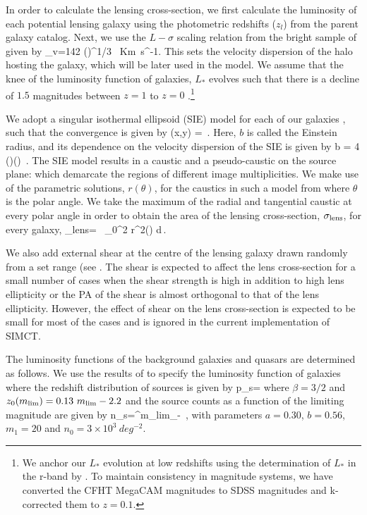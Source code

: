\documentclass[useAMS,usenatbib,a4paper]{mn2e}
\begin{document}
In order to calculate the lensing cross-section, we first calculate the
luminosity of each potential lensing galaxy using the photometric redshifts
($z_l$) from the parent galaxy catalog. Next, we use the $L-\sigma$ scaling relation from the
bright sample of \citep{Parker2005} given by
\be
\label{magstar2}
\sigma_v=142 \left(\right)^{1/3} \, {\rm Km~s^{-1}}.
\ee
This sets the velocity dispersion of the halo
hosting the galaxy, which will be later used in the model.
We assume that the knee of the luminosity function of galaxies, $L_*$ evolves
such that there is a decline of $1.5$ magnitudes between $z=1$ to $z=0$
\citep{Faber2007}.\footnote{We anchor our $L_*$ evolution at low redshifts using the
determination of $L_*$ in the r-band by \citet{Blanton2001}. To maintain
consistency in magnitude systems, we have converted the CFHT MegaCAM magnitudes
to SDSS magnitudes and k-corrected them to $z=0.1$.}

We adopt a singular isothermal ellipsoid (SIE) model for each of our galaxies
\citep{Kormann1994}, such that the convergence is given by
\be
\kappa (x,y) =  \,.
\ee
Here, $b$ is called the Einstein radius, and its dependence on the velocity
dispersion of the SIE is given by
\be
b = 4\pi\,
\left(\right)\left(\right) \,.
\ee
The SIE model results in a caustic and a pseudo-caustic on the source
plane: which demarcate the regions of different image multiplicities. We
make use of the parametric solutions, $r(\theta)$, for the caustics in
such a model from \citet{Keeton2000b} where $\theta$ is the polar angle.
We take the maximum of the radial and tangential caustic at every polar
angle in order to obtain the area of the lensing cross-section,
$\sigma_{\rm lens}$, for every galaxy,
\be
\sigma_{\rm lens}= \, \int_0^{2\pi} r^2(\theta) d\theta \,.
\ee

We also add external shear at the centre of the lensing galaxy
drawn randomly from a set range (see . The shear is
expected to affect the lens cross-section for a small number of cases
when the shear strength is high in addition to high lens ellipticity or
the PA of the shear is almost orthogonal to that of the lens
ellipticity. However, the effect of shear on the lens cross-section is
expected to be small for most of the cases and is ignored in the current
implementation of SIMCT.

The luminosity functions of the background galaxies and quasars are
determined as follows. We use the results of \citet{Faure2009} to specify the luminosity
function of galaxies where the redshift distribution of sources is
given by
\be
\label{eqn:ps}
p_s=
\ee
where $\beta=3/2$ and $z_0(m_{\rm lim})=0.13~m_{\rm lim} - 2.2$ and the source
counts as a function of the limiting magnitude are given by
\be
\label{eqn:ns}
n_s=\int^{m_{\rm lim}}_{-\infty} 
\,,
\ee
with parameters $a=0.30$, $b=0.56$, $m_1=20$ and $n_0=3\times10^3~deg^{-2}$.
\end{document}
